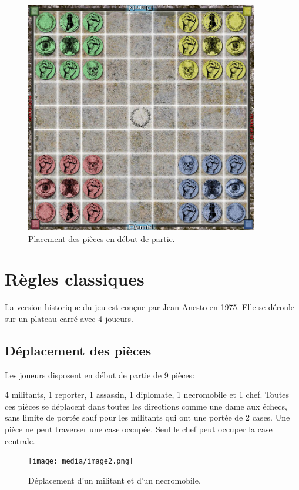 \documentclass{article}
\begin{document}
\begin{figure}[ht]
\centering
\includegraphics[width=4in,height=4in]{media/image3.png}
\caption{Placement des pièces en début de partie.}
\end{figure}

\newpage

\tableofcontents

\newpage

\section{Règles classiques}
La version historique du jeu est conçue par Jean Anesto en 1975.
Elle se déroule sur un plateau carré avec 4 joueurs.


\subsection{Déplacement des pièces}
Les joueurs disposent en début de partie de 9 pièces:

4 militants, 1 reporter, 1 assassin, 1 diplomate, 1 necromobile et 1 chef.
Toutes ces pièces se déplacent dans toutes les directions comme une dame aux échecs, sans limite de portée sauf pour les militants
qui ont une portée de 2 cases. Une pièce ne peut traverser une case occupée. Seul le chef peut occuper la case centrale.

\vspace{20pt} %

\begin{center}
\begin{figure}[ht]
\centering
\texttt{[image: media/image2.png]}
\caption{Déplacement d'un militant et d'un necromobile.}
\end{figure}
    

\end{center}
\end{document}
